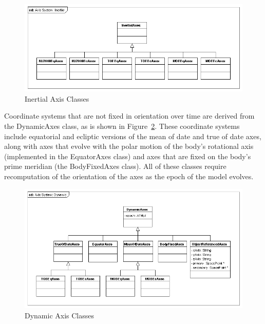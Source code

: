 \begin{figure}
\begin{center}
\includegraphics[365,147]{Images/AxisSystemInertial.png}
\caption{\label{figure:InertialAxisHierarchy}Inertial Axis Classes}
\end{center}
\end{figure}

Coordinate systems that are not fixed in orientation over time are derived from the DynamicAxes
class, as is shown in Figure~\ref{figure:DynamicAxisHierarchy}.  These coordinate systems include
equatorial and ecliptic versions of the mean of date and true of date axes, along with axes that
evolve with the polar motion of the body's rotational axis (implemented in the EquatorAxes class)
and axes that are fixed on the body's prime meridian (the BodyFixedAxes class). All of these classes
require recomputation of the orientation of the axes as the epoch of the model evolves.

\begin{figure}
\begin{center}
\includegraphics[376,206]{Images/AxisSystemDynamic.png}
\caption{\label{figure:DynamicAxisHierarchy}Dynamic Axis Classes}
\end{center}
\end{figure}

